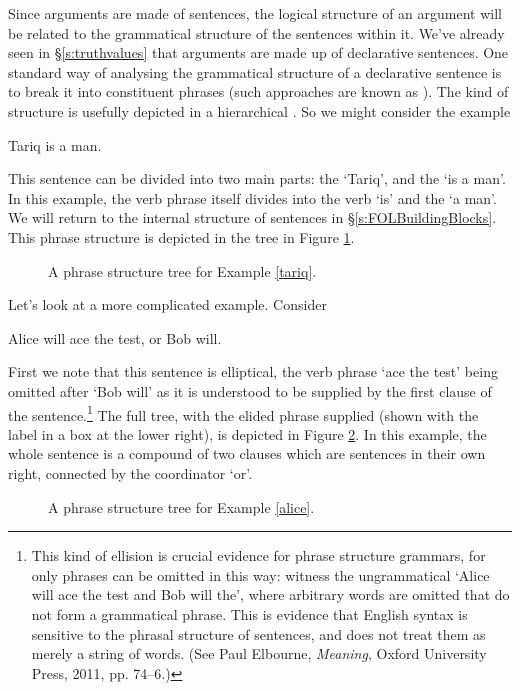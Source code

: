 Since arguments are made of sentences, the logical structure of an argument will be related to the grammatical structure of the sentences within it. We've already seen in §\ref{s:truthvalues} that arguments are made up of declarative sentences. One standard way of analysing the grammatical structure of a declarative sentence is to break it into constituent phrases (such approaches are known as  ). The kind of structure is usefully depicted in a hierarchical . So we might consider the example \begin{earg}
	\item[\ex{tariq}] Tariq is a man.
\end{earg} This sentence can be divided into two main parts: the  `Tariq', and the  `is a man'. In this example, the verb phrase itself divides into the verb `is' and the  `a man'. We will return to the internal structure of sentences in §\ref{s:FOLBuildingBlocks}. This phrase structure is depicted in the tree in Figure \ref{fig:tariq}. 
\begin{figure}
\caption{A phrase structure tree for Example \ref{tariq}. \label{fig:tariq}}
\end{figure}

Let's look at a more complicated example. Consider \begin{earg}
	\item[\ex{alice}] Alice will ace the test, or Bob will.
\end{earg} First we note that this sentence is elliptical, the verb phrase `ace the test' being omitted after `Bob will' as it is understood to be supplied by the first clause of the sentence.\footnote{This kind of ellision is crucial evidence for phrase structure grammars, for only phrases can be omitted in this way: witness the ungrammatical `Alice will ace the test and Bob will the', where arbitrary words are omitted that do not form a grammatical phrase. This is evidence that English syntax is sensitive to the phrasal structure of sentences, and does not treat them as merely a string of words. (See Paul Elbourne, \emph{Meaning}, Oxford University Press, 2011, pp. 74–6.)} The full tree, with the elided phrase supplied (shown with the label in a box at the lower right), is depicted in Figure \ref{fig:alice}. In this example, the whole sentence is a compound of two clauses which are sentences in their own right, connected by the coordinator `or'.
\begin{figure}
 	\caption{A phrase structure tree for Example \ref{alice}. \label{fig:alice}}
\end{figure} 

